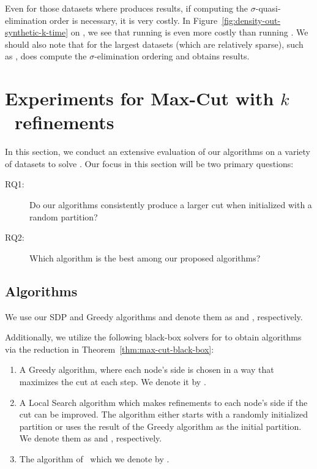 Even for those datasets where \denseSQD produces results, if computing the
$\sigma$-quasi-elimination order is necessary, it is very costly. 
In Figure~\ref{fig:density-out-synthetic-k-time} on \sparse, we see that running
\denseSQD is even more costly than running \denseSDPalgo. 
We should also note that for the largest datasets (which are relatively sparse),
such as \dblp, \denseSQD does compute the $\sigma$-elimination ordering and
obtains results.






\section{Experiments for Max-Cut with $k$~refinements}
\label{sec:exp:cut}

In this section, we conduct an extensive evaluation of our algorithms on a
variety of datasets to solve \maxcutkc. Our focus in this section will be two primary questions:

\begin{description}
\item[RQ1:] Do our algorithms consistently produce a larger cut when initialized with a random partition?
\item[RQ2:] Which algorithm is the best among our proposed algorithms?
\end{description}

\subsection{Algorithms} 
We use our SDP and Greedy algorithms and denote them as \cutSDPalgo and
\cutGreedy, respectively.

Additionally, we utilize the following black-box solvers for \maxcut to obtain
algorithms via the reduction in Theorem~\ref{thm:max-cut-black-box}:
\begin{enumerate}
\item A Greedy algorithm, where each node's side is chosen in a way that
	maximizes the cut at each step. We denote it by \cutBlackGreedy.
\item A Local Search algorithm which makes refinements to each node's side if
	the cut can be improved.  The algorithm either starts with a randomly
	initialized partition or uses the result of the Greedy algorithm as the
	initial partition.  We denote them
	as \cutBlackLocalOne and \cutBlackLocalTwo, respectively.
\item The \sdp algorithm of~\citet{goemans1995improved} which we denote by \cutBlackSDP.
\end{enumerate}

